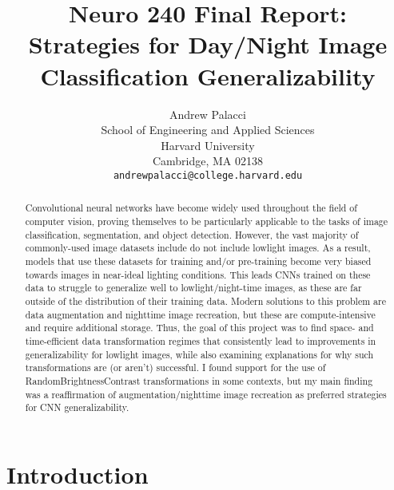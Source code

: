 \documentclass{article}
\title{Neuro 240 Final Report: \\ Strategies for Day/Night Image \\ Classification Generalizability}
\author{
  Andrew Palacci \\
  School of Engineering and Applied Sciences\\
  Harvard University\\
  Cambridge, MA 02138 \\
  \texttt{andrewpalacci@college.harvard.edu} \\
}
\begin{document}
\maketitle


\begin{abstract}
  Convolutional neural networks have become widely used throughout the field of computer vision, proving themselves to be particularly applicable to the tasks of image classification, segmentation, and object detection. However, the vast majority of commonly-used image datasets include do not include lowlight images. As a result, models that use these datasets for training and/or pre-training become very biased towards images in near-ideal lighting conditions. This leads CNNs trained on these data to struggle to generalize well to lowlight/night-time images, as these are far outside of the distribution of their training data. Modern solutions to this problem are data augmentation and nighttime image recreation, but these are compute-intensive and require additional storage. Thus, the goal of this project was to find space- and time-efficient data transformation regimes that consistently lead to improvements in generalizability for lowlight images, while also examining explanations for why such transformations are (or aren't) successful. I found support for the use of RandomBrightnessContrast transformations in some contexts, but my main finding was a reaffirmation of augmentation/nighttime image recreation as preferred strategies for CNN generalizability.
\end{abstract}


\section{Introduction}
\end{document}
